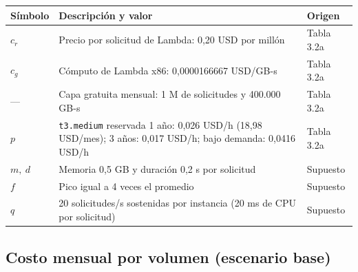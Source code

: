 \documentclass[12pt, letterpaper, table, xcdraw]{inf-pucv}
\begin{document}
{\small
\begin{center}
\begin{tabular}{|l|p{6.0cm}|p{2.6cm}|}
\hline
\textbf{Símbolo} & \textbf{Descripción y valor} & \textbf{Origen} \\ \hline
$c_r$ & Precio por solicitud de Lambda: 0,20 USD por millón & Tabla 3.2a \\ \hline
$c_g$ & Cómputo de Lambda x86: 0,0000166667 USD/GB-s & Tabla 3.2a \\ \hline
--- & Capa gratuita mensual: 1 M de solicitudes y 400.000 GB-s & Tabla 3.2a \\ \hline
$p$ & \texttt{t3.medium} reservada 1 año: 0,026 USD/h (18,98 USD/mes); 3 años: 0,017 USD/h; bajo demanda: 0,0416 USD/h & Tabla 3.2a \\ \hline
$m,\ d$ & Memoria 0,5 GB y duración 0,2 s por solicitud & Supuesto \\ \hline
$f$ & Pico igual a 4 veces el promedio & Supuesto \\ \hline
$q$ & 20 solicitudes/s sostenidas por instancia (20 ms de CPU por solicitud) & Supuesto \\ \hline
\end{tabular}
\end{center}
}
\clearpage

\subsection*{Costo mensual por volumen (escenario base)}
\end{document}
